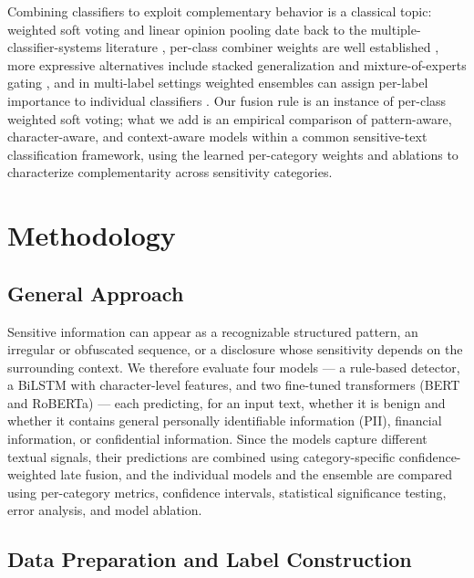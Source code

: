 \documentclass{article}
\begin{document}
Combining classifiers to exploit complementary behavior is a classical
topic: weighted soft voting and linear opinion pooling date back to the
multiple-classifier-systems literature \citep{kittler1998combining},
per-class combiner weights are well established
\citep{kuncheva2004combining}, more expressive alternatives include
stacked generalization \citep{wolpert1992stacked} and
mixture-of-experts gating \citep{jacobs1991adaptive}, and in
multi-label settings weighted ensembles can assign per-label importance
to individual classifiers \citep{xia2021multilabel}. Our fusion rule is
an instance of per-class weighted soft voting; what we add is an
empirical comparison of pattern-aware, character-aware, and
context-aware models within a common sensitive-text classification
framework, using the learned per-category weights and ablations to
characterize complementarity across sensitivity categories.

\section{Methodology}
\label{sec:methodology}

\subsection{General Approach}
\label{subsec:general-approach}

Sensitive information can appear as a recognizable structured pattern,
an irregular or obfuscated sequence, or a disclosure whose sensitivity
depends on the surrounding context. We therefore evaluate four models
--- a rule-based detector, a BiLSTM with character-level features, and
two fine-tuned transformers (BERT and RoBERTa) --- each predicting, for
an input text, whether it is benign and whether it contains general
personally identifiable information (PII), financial information, or
confidential information. Since the models capture different textual
signals, their predictions are combined using category-specific
confidence-weighted late fusion, and the individual models and the
ensemble are compared using per-category metrics, confidence intervals,
statistical significance testing, error analysis, and model ablation.

\subsection{Data Preparation and Label Construction}
\label{subsec:data-preparation}
\end{document}
